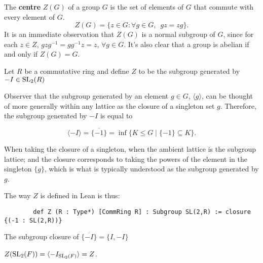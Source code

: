 \begin{definition}
\leanok
The \textbf{centre} $Z(G)$ of a group $G$ is the set of elements of  $G$ that commute with every element of $G$.
\begin {equation*} Z(G) = \{ z \in G : \forall g \in G, \hspace{6pt} gz=zg \}. \end{equation*}
It is an immediate observation that $Z(G)$ is a normal subgroup of $G$, 
since for each $z \in Z$, $gzg^{-1} = gg^{-1}z = z$, $\forall g \in G$. It's also clear that a group is abelian if and only if $Z(G)=G$.
\end{definition}



\begin{definition}
\label{SpecialSubgroups.Z}
\leanok
    Let $R$ be a commutative ring and define $Z$ to be the subgroup generated by $- I \in \operatorname{SL}_2(R)$
\end{definition}

\begin{remark}
    Observer that the subgroup generated by an element $g \in G$, $\langle g \rangle$, can be thought of more generally within any lattice as the closure of a singleton set ${g}$. Therefore, the subgroup generated by $-I$ is equal to
    
    \[\langle -I \rangle = \overline{\{-1\}} = \inf \{ K \le G \; | \; \{-1\} \subseteq K \}.\]

    When taking the closure of a singleton, when the ambient lattice is the subgroup lattice; and the closure corresponds to taking the powers of the element in the singleton $\{g\}$,
    which is what is typically understood as the subgroup generated by $g$.

    The way $Z$ is defined in Lean is thus:
    \begin{verbatim}
        def Z (R : Type*) [CommRing R] : Subgroup SL(2,R) := closure {(-1 : SL(2,R))}
    \end{verbatim}
\end{remark}

\begin{lemma}
\label{SpecialSubgroups.closure_neg_one_eq}
\leanok
The subgroup closure of $\overline{\{-I\}} = \{I, -I\}$
\end{lemma}

\begin{lemma}
\label{SpecialSubgroups.center_SL2_eq_Z}
\leanok
$Z(\operatorname{SL}_2(F)) = \langle - I_{\operatorname{SL}_2(F)}\rangle = Z$.
\end{lemma}

